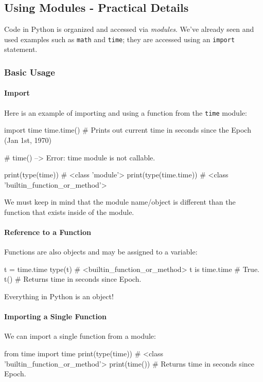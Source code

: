 \documentclass[12pt,letterpaper,twoside]{article}
\begin{document}
\subsection{Using Modules - Practical Details} Code in Python is organized and accessed via \emph{modules}. We've already seen and used  examples such as
\texttt{math} and \texttt{time}; they are accessed using an \texttt{import} statement.

\subsubsection{Basic Usage}
\paragraph{Import}
Here is an example of importing and using a function from the
\texttt{time} module:

\begin{python}
import time
time.time()    # Prints out current time in seconds since the Epoch (Jan 1st, 1970)

# time()                --> Error: time module is not callable.

print(type(time))       # <class 'module'>
print(type(time.time))  # <class 'builtin_function_or_method'>

\end{python}
We must keep in mind that the module name/object is different 
than the function that exists inside of the module.

\paragraph{Reference to a Function}
Functions are also objects and may be assigned to a variable:

\begin{python}
t = time.time
type(t)          # <builtin_function_or_method>
t is time.time   # True.
t()              # Returns time in seconds since Epoch.
\end{python}

Everything in Python is an object!

\paragraph{Importing a Single Function}
We can import a single function from a module:

\begin{python}
from time import time
print(type(time))   # <class 'builtin_function_or_method'>
print(time())       # Returns time in seconds since Epoch.
\end{python}
\end{document}
